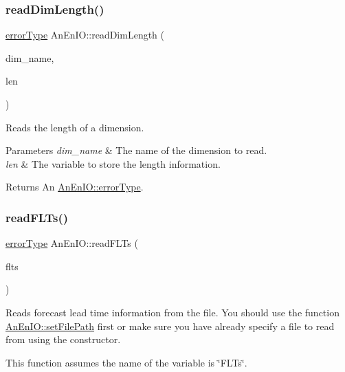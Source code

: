 \subsubsection{\texorpdfstring{read\+Dim\+Length()}{readDimLength()}}
{\footnotesize\ttfamily \mbox{\hyperlink{class_an_en_i_o_aa56bc1ec6610b86db4349bce20f9ead0}{error\+Type}} An\+En\+I\+O\+::read\+Dim\+Length (\begin{DoxyParamCaption}\item[{std\+::string}]{dim\+\_\+name,  }\item[{std\+::size\+\_\+t \&}]{len }\end{DoxyParamCaption})}

Reads the length of a dimension.


\begin{DoxyParams}{Parameters}
{\em dim\+\_\+name} & The name of the dimension to read. \\
\hline
{\em len} & The variable to store the length information. \\
\hline
\end{DoxyParams}
\begin{DoxyReturn}{Returns}
An \mbox{\hyperlink{class_an_en_i_o_aa56bc1ec6610b86db4349bce20f9ead0}{An\+En\+I\+O\+::error\+Type}}. 
\end{DoxyReturn}
\mbox{\label{class_an_en_i_o_aa58735032dd6f54c83d6450842922d3f}} 
\subsubsection{\texorpdfstring{read\+F\+L\+Ts()}{readFLTs()}}
{\footnotesize\ttfamily \mbox{\hyperlink{class_an_en_i_o_aa56bc1ec6610b86db4349bce20f9ead0}{error\+Type}} An\+En\+I\+O\+::read\+F\+L\+Ts (\begin{DoxyParamCaption}\item[{\mbox{\hyperlink{classanen_time_1_1_f_l_ts}{anen\+Time\+::\+F\+L\+Ts}} \&}]{flts }\end{DoxyParamCaption})}

Reads forecast lead time information from the file. You should use the function \mbox{\hyperlink{class_an_en_i_o_a98066d375cc78694fda2af1ce37cc8d8}{An\+En\+I\+O\+::set\+File\+Path}} first or make sure you have already specify a file to read from using the constructor.

This function assumes the name of the variable is \char`\"{}\+F\+L\+Ts\char`\"{}.


